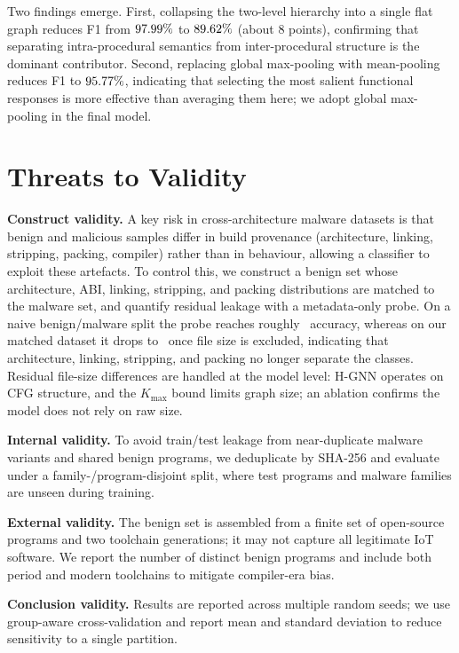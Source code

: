 \documentclass{llncs}
\begin{document}
Two findings emerge. First, collapsing the two-level hierarchy into a
single flat graph reduces F1 from $97.99\%$ to $89.62\%$
(about $8$ points), confirming that separating intra-procedural semantics
from inter-procedural structure is the dominant contributor. Second,
replacing global max-pooling with mean-pooling reduces F1 to $95.77\%$,
indicating that selecting the most salient functional responses is more
effective than averaging them here; we adopt global max-pooling in the
final model.


\section{Threats to Validity}
\label{sec:threats}

\textbf{Construct validity.} A key risk in cross-architecture malware datasets is that benign and
malicious samples differ in build provenance (architecture, linking, stripping, packing, compiler)
rather than in behaviour, allowing a classifier to exploit these artefacts. To control this, we
construct a benign set whose architecture, ABI, linking, stripping, and packing distributions are
matched to the malware set, and quantify residual leakage with a metadata-only probe. On a naive
benign/malware split the probe reaches roughly \hgnnProbeOld\ accuracy, whereas on our matched dataset
it drops to \hgnnProbeNoSize\ once file size is excluded, indicating that architecture, linking,
stripping, and packing no longer separate the classes. Residual file-size differences are handled at
the model level: H-GNN operates on CFG structure, and the $K_{\max}$ bound limits graph size; an
ablation confirms the model does not rely on raw size.

\textbf{Internal validity.} To avoid train/test leakage from near-duplicate malware variants and
shared benign programs, we deduplicate by SHA-256 and evaluate under a family-/program-disjoint split,
where test programs and malware families are unseen during training.

\textbf{External validity.} The benign set is assembled from a finite set of open-source programs and
two toolchain generations; it may not capture all legitimate IoT software. We report the number of
distinct benign programs and include both period and modern toolchains to mitigate compiler-era bias.

\textbf{Conclusion validity.} Results are reported across multiple random seeds; we use group-aware
cross-validation and report mean and standard deviation to reduce sensitivity to a single partition.
\end{document}
